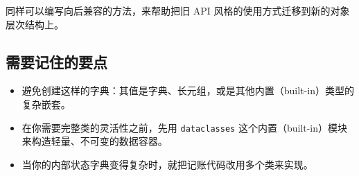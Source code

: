 同样可以编写向后兼容的方法，来帮助把旧 API 风格的使用方式迁移到新的对象层次结构上。

\subsection{需要记住的要点}

\begin{itemize}
\item 避免创建这样的字典：其值是字典、长元组，或是其他内置（built-in）类型的复杂嵌套。
\item 在你需要完整类的灵活性之前，先用 \texttt{dataclasses} 这个内置（built-in）模块来构造轻量、不可变的数据容器。
\item 当你的内部状态字典变得复杂时，就把记账代码改用多个类来实现。
\end{itemize}
